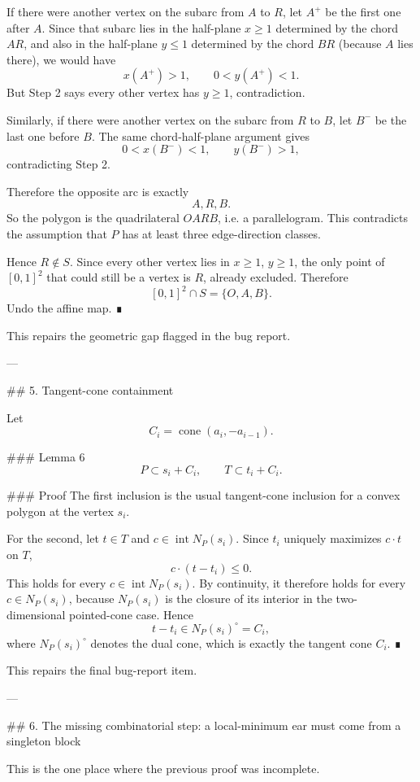 If there were another vertex on the subarc from \(A\) to \(R\), let \(A^+\) be the first one after \(A\). Since that subarc lies in the half-plane \(x\ge1\) determined by the chord \(AR\), and also in the half-plane \(y\le1\) determined by the chord \(BR\) (because \(A\) lies there), we would have
\[
x(A^+)>1,\qquad 0<y(A^+)<1.
\]
But Step 2 says every other vertex has \(y\ge1\), contradiction.

Similarly, if there were another vertex on the subarc from \(R\) to \(B\), let \(B^-\) be the last one before \(B\). The same chord-half-plane argument gives
\[
0<x(B^-)<1,\qquad y(B^-)>1,
\]
contradicting Step 2.

Therefore the opposite arc is exactly
\[
A,R,B.
\]
So the polygon is the quadrilateral \(OARB\), i.e. a parallelogram. This contradicts the assumption that \(P\) has at least three edge-direction classes.

Hence \(R\notin S\). Since every other vertex lies in \(x\ge1\), \(y\ge1\), the only point of \([0,1]^2\) that could still be a vertex is \(R\), already excluded. Therefore
\[
[0,1]^2\cap S=\{O,A,B\}.
\]
Undo the affine map. ∎

This repairs the geometric gap flagged in the bug report.

---

## 5. Tangent-cone containment

Let
\[
C_i=\operatorname{cone}(a_i,-a_{i-1}).
\]

### Lemma 6
\[
P\subset s_i+C_i,
\qquad
T\subset t_i+C_i.
\]

### Proof
The first inclusion is the usual tangent-cone inclusion for a convex polygon at the vertex \(s_i\).

For the second, let \(t\in T\) and \(c\in \operatorname{int}N_P(s_i)\). Since \(t_i\) uniquely maximizes \(c\cdot t\) on \(T\),
\[
c\cdot(t-t_i)\le0.
\]
This holds for every \(c\in \operatorname{int}N_P(s_i)\). By continuity, it therefore holds for every \(c\in N_P(s_i)\), because \(N_P(s_i)\) is the closure of its interior in the two-dimensional pointed-cone case. Hence
\[
t-t_i\in N_P(s_i)^\circ=C_i,
\]
where \(N_P(s_i)^\circ\) denotes the dual cone, which is exactly the tangent cone \(C_i\). ∎

This repairs the final bug-report item.

---

## 6. The missing combinatorial step: a local-minimum ear must come from a singleton block

This is the one place where the previous proof was incomplete.

